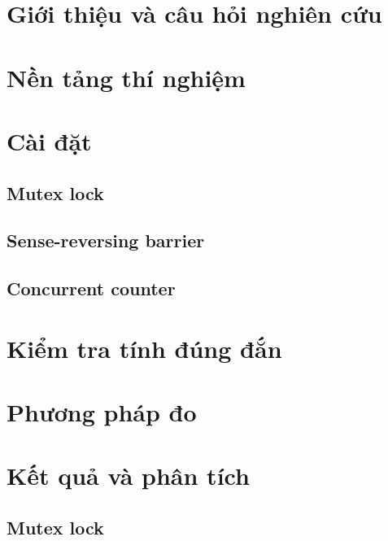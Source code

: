\section{Giới thiệu và câu hỏi nghiên cứu}


\section{Nền tảng thí nghiệm}


\section{Cài đặt}\label{sec:impl}
\subsection{Mutex lock}

\subsection{Sense-reversing barrier}

\subsection{Concurrent counter}


\section{Kiểm tra tính đúng đắn}


\section{Phương pháp đo}


\section{Kết quả và phân tích}
\subsection{Mutex lock}

